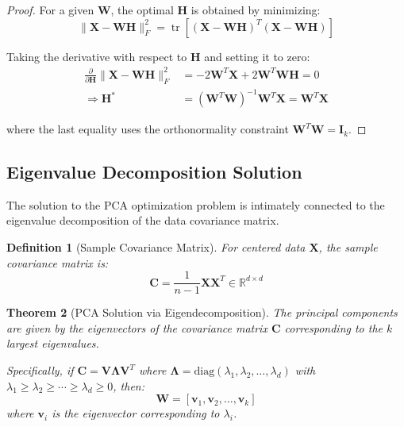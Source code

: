 \documentclass[12pt]{article}
\renewcommand{\vec}[1]{\mathbf{#1}}
\DeclareMathOperator{\tr}{tr}
\newtheorem{theorem}{Theorem}[section]
\newtheorem{definition}[theorem]{Definition}
\begin{document}
\begin{proof}
    For a given $\vec{W}$, the optimal $\vec{H}$ is obtained by minimizing:
    \begin{equation}
        \|\vec{X} - \vec{W}\vec{H}\|_F^2 = \tr[(\vec{X} - \vec{W}\vec{H})^T(\vec{X} - \vec{W}\vec{H})]
    \end{equation}

    Taking the derivative with respect to $\vec{H}$ and setting it to zero:
    \begin{align}
        \frac{\partial}{\partial \vec{H}} \|\vec{X} - \vec{W}\vec{H}\|_F^2 & = -2\vec{W}^T\vec{X} + 2\vec{W}^T\vec{W}\vec{H} = 0          \\
        \Rightarrow \vec{H}^*                                              & = (\vec{W}^T\vec{W})^{-1}\vec{W}^T\vec{X} = \vec{W}^T\vec{X}
    \end{align}

    where the last equality uses the orthonormality constraint $\vec{W}^T\vec{W} = \vec{I}_k$.
\end{proof}

\subsection{Eigenvalue Decomposition Solution}


The solution to the PCA optimization problem is intimately connected to the eigenvalue decomposition of the data covariance matrix.

\begin{definition}[Sample Covariance Matrix]
    For centered data $\vec{X}$, the sample covariance matrix is:
    \begin{equation}
        \vec{C} = \frac{1}{n-1}\vec{X}\vec{X}^T \in \mathbb{R}^{d \times d}
    \end{equation}
\end{definition}

\begin{theorem}[PCA Solution via Eigendecomposition] \label{thm:pca_eigen}
    The principal components are given by the eigenvectors of the covariance matrix $\vec{C}$ corresponding to the $k$ largest eigenvalues.

    Specifically, if $\vec{C} = \vec{V}\vec{\Lambda}\vec{V}^T$ where $\vec{\Lambda} = \text{diag}(\lambda_1, \lambda_2, \ldots, \lambda_d)$ with $\lambda_1 \geq \lambda_2 \geq \cdots \geq \lambda_d \geq 0$, then:
    \begin{equation}
        \boxed{\vec{W} = [\vec{v}_1, \vec{v}_2, \ldots, \vec{v}_k]}
    \end{equation}
    where $\vec{v}_i$ is the eigenvector corresponding to $\lambda_i$.
\end{theorem}
\end{document}

